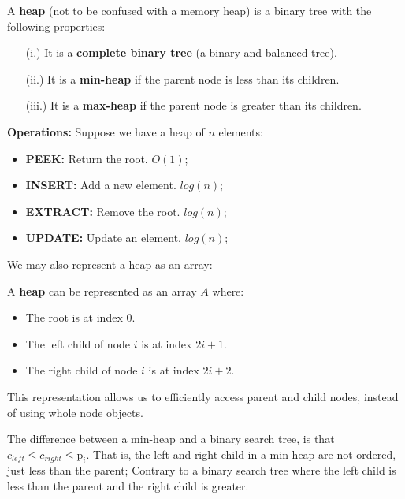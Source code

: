 \begin{Def}

    A \textbf{heap} (not to be confused with a memory heap) is a binary tree with the following properties:
    \begin{enumerate}
        \item[(i.)] It is a \textbf{complete binary tree} (a binary and balanced tree).
        \item[(ii.)] It is a \textbf{min-heap} if the parent node is less than its children.
        \item[(iii.)] It is a \textbf{max-heap} if the parent node is greater than its children.
    \end{enumerate}
    \noindent
    \textbf{Operations:} Suppose we have a heap of $n$ elements:
    \begin{itemize}
        \item \textbf{PEEK:} Return the root. $O(1)$;
        \item \textbf{INSERT:} Add a new element. $log(n)$;
        \item \textbf{EXTRACT:} Remove the root. $log(n)$;
        \item \textbf{UPDATE:} Update an element. $log(n)$;
    \end{itemize}
\end{Def}

\newpage

\noindent
We may also represent a heap as an array:
\begin{Def}
    A \textbf{heap} can be represented as an array $A$ where:
    \begin{itemize}
        \item The root is at index $0$.
        \item The left child of node $i$ is at index $2i + 1$.
        \item The right child of node $i$ is at index $2i + 2$.
    \end{itemize}
    \noindent
    This representation allows us to efficiently access parent and child nodes, instead of using whole node objects.
\end{Def}

\begin{Tip}
    The difference between a min-heap and a binary search tree, is that $c_{left} \leq c_{right} \leq \text{p}_{i}$. That is, the left and right child in a min-heap are not ordered, just less than the parent;
    Contrary to a binary search tree where the left child is less than the parent and the right child is greater.
\end{Tip}

